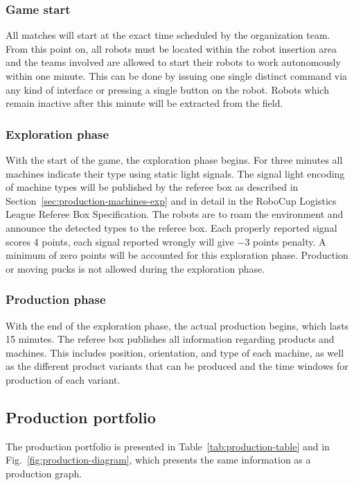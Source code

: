 \documentclass[12pt,twoside]{article}
\newcommand{\refsec}[1]{Section~\ref{#1}}
\begin{document}
\subsubsection{Game start}
\label{sec:game-start}
%
All matches will start at the exact time scheduled by the organization
team. From this point on, all robots must be located within the robot 
insertion area and the teams involved are allowed to start their robots 
to work autonomously within one minute. This can be done
by issuing one single distinct command via any kind of interface or
pressing a single button on the robot. Robots which remain inactive
after this minute will be extracted from the field.

\subsubsection{Exploration phase}
\label{sec:expphase}
%
With the start of the game, the exploration phase begins. For three
minutes all machines indicate their type using static light signals. The
signal light encoding of machine types will be published by the
referee box as described in \refsec{sec:production-machines-exp} and
in detail in the RoboCup Logistics League Referee Box
Specification. The robots are to roam the environment and announce the
detected types to the referee box.  Each properly reported signal
scores \num{+4} points, each signal reported wrongly will give
\num{-3} points penalty. A minimum of zero points will be accounted
for this exploration phase. Production or moving pucks is not allowed
during the exploration phase.


\subsubsection{Production phase}
\label{sec:production-phase}

With the end of the exploration phase, the actual production begins,
which lasts \num{15} minutes. The referee box publishes all information
regarding products and machines. This includes position, orientation,
and type of each machine, as well as the different product variants
that can be produced and the time windows for production of each
variant. 


\subsection{Production portfolio}
\label{sec:prodportfolio}

The production portfolio is presented in
Table~\ref{tab:production-table} and in
Fig.~\ref{fig:production-diagram}, which presents the same information
as a production graph.
\end{document}
